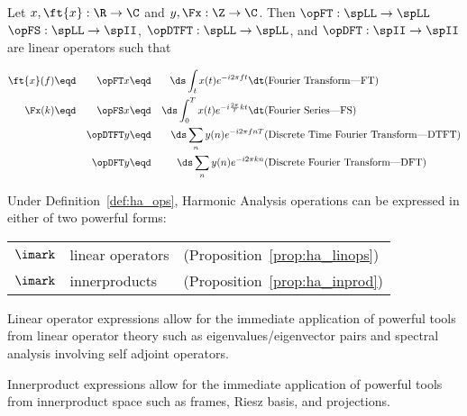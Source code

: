 \begin{definition}
\label{def:ha_ops}
\label{def:fs}
                
 
   
Let $x,\ft{x}:\R\to\C$ and $y,\Fx:\Z\to\C$. Then 
$\opFT  :\spLL\to\spLL$
$\opFS  :\spLL\to\spII$, 
$\opDTFT:\spLL\to\spLL$, and 
$\opDFT :\spII\to\spII$
are linear operators such that

\begin{align*}
   \ft{x}(f) &\eqd& \opFT   x &\eqd& \ds \int_t   x(t) e^{-i2\pi ft         } \dt & \mbox{(Fourier Transform---FT)                } \\
   \Fx(k) &\eqd& \opFS   x &\eqd& \ds \int_0^T x(t) e^{-i\frac{2\pi}{T}kt} \dt & \mbox{(Fourier Series---FS)                   } \\
             &    & \opDTFT y &\eqd& \ds \sum_n   y(n) e^{-i2\pi fnT        }     & \mbox{(Discrete Time Fourier Transform---DTFT)} \\
             &    & \opDFT  y &\eqd& \ds \sum_n   y(n) e^{-i2\pi kn         }     & \mbox{(Discrete Fourier Transform---DFT)      } 
\end{align*}
\end{definition}

Under Definition~\ref{def:ha_ops}, Harmonic Analysis operations 
can be expressed in either of two powerful forms:

\begin{tabular}{cll}
   $\imark$ & linear operators & (Proposition~\ref{prop:ha_linops})\\
   $\imark$ & innerproducts \footnotemark
             & (Proposition~\ref{prop:ha_inprod})
\end{tabular}

Linear operator expressions allow for the immediate application 
of powerful tools from linear operator theory such as 
eigenvalues/eigenvector pairs and spectral analysis
involving self adjoint operators.

Innerproduct expressions allow for the immediate application 
of powerful tools from innerproduct space such as 
frames, Riesz basis, and projections.

